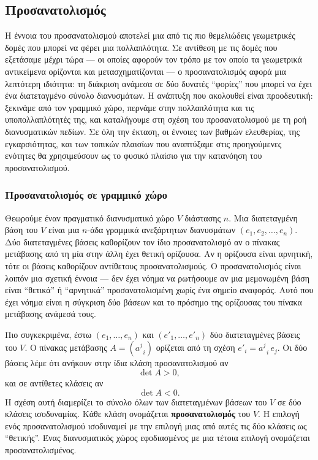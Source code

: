 \documentclass[12pt]{article}
\begin{document}
\subsection{Προσανατολισμός}

Η έννοια του προσανατολισμού αποτελεί μια από τις πιο θεμελιώδεις γεωμετρικές δομές που μπορεί να φέρει μια πολλαπλότητα. Σε αντίθεση με τις δομές που εξετάσαμε μέχρι τώρα --- οι οποίες αφορούν τον τρόπο με τον οποίο τα γεωμετρικά αντικείμενα ορίζονται και μετασχηματίζονται --- ο προσανατολισμός αφορά μια λεπτότερη ιδιότητα: τη διάκριση ανάμεσα σε δύο δυνατές ``φορίες'' που μπορεί να έχει ένα διατεταγμένο σύνολο διανυσμάτων. Η ανάπτυξη που ακολουθεί είναι προοδευτική: ξεκινάμε από τον γραμμικό χώρο, περνάμε στην πολλαπλότητα και τις υποπολλαπλότητές της, και καταλήγουμε στη σχέση του προσανατολισμού με τη ροή διανυσματικών πεδίων. Σε όλη την έκταση, οι έννοιες των βαθμών ελευθερίας, της εγκαρσιότητας, και των τοπικών πλαισίων που αναπτύξαμε στις προηγούμενες ενότητες θα χρησιμεύσουν ως το φυσικό πλαίσιο για την κατανόηση του προσανατολισμού.

\subsubsection{Προσανατολισμός σε γραμμικό χώρο}

Θεωρούμε έναν πραγματικό διανυσματικό χώρο $V$ διάστασης $n$. Μια διατεταγμένη βάση του $V$ είναι μια $n$-άδα γραμμικά ανεξάρτητων διανυσμάτων $(e_1, e_2, \dots, e_n)$. Δύο διατεταγμένες βάσεις καθορίζουν τον ίδιο προσανατολισμό αν ο πίνακας μετάβασης από τη μία στην άλλη έχει θετική ορίζουσα. Αν η ορίζουσα είναι αρνητική, τότε οι βάσεις καθορίζουν αντίθετους προσανατολισμούς. Ο προσανατολισμός είναι λοιπόν μια σχετική έννοια --- δεν έχει νόημα να ρωτήσουμε αν μια μεμονωμένη βάση είναι ``θετικά'' ή ``αρνητικά'' προσανατολισμένη χωρίς ένα σημείο αναφοράς. Αυτό που έχει νόημα είναι η σύγκριση δύο βάσεων και το πρόσημο της ορίζουσας του πίνακα μετάβασης ανάμεσά τους.

Πιο συγκεκριμένα, έστω $(e_1, \dots, e_n)$ και $(e'_1, \dots, e'_n)$ δύο διατεταγμένες βάσεις του $V$. Ο πίνακας μετάβασης $A = (a^j_{\;\; i})$ ορίζεται από τη σχέση $e'_i = a^j_{\;\; i} \, e_j$. Οι δύο βάσεις λέμε ότι ανήκουν στην ίδια κλάση προσανατολισμού αν
\[
\det A > 0,
\]
και σε αντίθετες κλάσεις αν
\[
\det A < 0.
\]
Η σχέση αυτή διαμερίζει το σύνολο όλων των διατεταγμένων βάσεων του $V$ σε δύο κλάσεις ισοδυναμίας. Κάθε κλάση ονομάζεται \textbf{προσανατολισμός} του $V$. Η επιλογή ενός προσανατολισμού ισοδυναμεί με την επιλογή μιας από αυτές τις δύο κλάσεις ως ``θετικής''. Ένας διανυσματικός χώρος εφοδιασμένος με μια τέτοια επιλογή ονομάζεται προσανατολισμένος.
\end{document}
